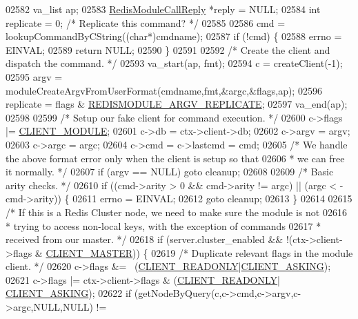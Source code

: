 \begin{DoxyCode}
{{{02582     va\_list ap;
02583     \hyperlink{structRedisModuleCallReply}{RedisModuleCallReply} *reply = NULL;
02584     \textcolor{keywordtype}{int} replicate = 0; \textcolor{comment}{/* Replicate this command? */}
02585 
02586     cmd = lookupCommandByCString((\textcolor{keywordtype}{char}*)cmdname);
02587     \textcolor{keywordflow}{if} (!cmd) \{
02588         errno = EINVAL;
02589         \textcolor{keywordflow}{return} NULL;
02590     \}
02591 
02592     \textcolor{comment}{/* Create the client and dispatch the command. */}
02593     va\_start(ap, fmt);
02594     c = createClient(-1);
02595     argv = moduleCreateArgvFromUserFormat(cmdname,fmt,&argc,&flags,ap);
02596     replicate = flags & \hyperlink{module_8c_a53bcac3a263b30f4600dec73c4b3d0ef}{REDISMODULE\_ARGV\_REPLICATE};
02597     va\_end(ap);
02598 
02599     \textcolor{comment}{/* Setup our fake client for command execution. */}
02600     c->flags |= \hyperlink{server_8h_a633251b1c4bbfe09c54a5c88920d8eda}{CLIENT\_MODULE};
02601     c->db = ctx->client->db;
02602     c->argv = argv;
02603     c->argc = argc;
02604     c->cmd = c->lastcmd = cmd;
02605     \textcolor{comment}{/* We handle the above format error only when the client is setup so that}
02606 \textcolor{comment}{     * we can free it normally. */}
02607     \textcolor{keywordflow}{if} (argv == NULL) \textcolor{keywordflow}{goto} cleanup;
02608 
02609     \textcolor{comment}{/* Basic arity checks. */}
02610     \textcolor{keywordflow}{if} ((cmd->arity > 0 && cmd->arity != argc) || (argc < -cmd->arity)) \{
02611         errno = EINVAL;
02612         \textcolor{keywordflow}{goto} cleanup;
02613     \}
02614 
02615     \textcolor{comment}{/* If this is a Redis Cluster node, we need to make sure the module is not}
02616 \textcolor{comment}{     * trying to access non-local keys, with the exception of commands}
02617 \textcolor{comment}{     * received from our master. */}
02618     \textcolor{keywordflow}{if} (server.cluster\_enabled && !(ctx->client->flags & \hyperlink{server_8h_a3d8f0cc8d0653ee2b6dafb454292c069}{CLIENT\_MASTER})) \{
02619         \textcolor{comment}{/* Duplicate relevant flags in the module client. */}
02620         c->flags &= ~(\hyperlink{server_8h_a84ba0494755e2f4f0faf6017175b5e0a}{CLIENT\_READONLY}|\hyperlink{server_8h_a108ac316dfd847430daf3c97f28557d3}{CLIENT\_ASKING});
02621         c->flags |= ctx->client->flags & (\hyperlink{server_8h_a84ba0494755e2f4f0faf6017175b5e0a}{CLIENT\_READONLY}|
      \hyperlink{server_8h_a108ac316dfd847430daf3c97f28557d3}{CLIENT\_ASKING});
02622         \textcolor{keywordflow}{if} (getNodeByQuery(c,c->cmd,c->argv,c->argc,NULL,NULL) !=
}}}
\end{DoxyCode}
